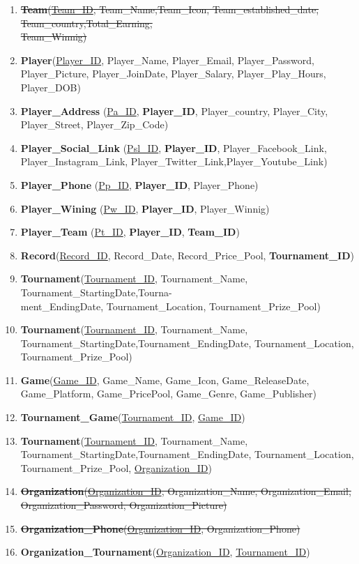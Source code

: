 \begin{enumerate}
    \item \sout{\textbf{Team}(\underline{Team\_ID}, Team\_Name,Team\_Icon, Team\_established\_date, Team\_country,Total\_Earning,\\Team\_Winnig)}
    \item \textbf{Player}(\underline{Player\_ID}, Player\_Name, Player\_Email, Player\_Password, Player\_Picture, Player\_JoinDate, Player\_Salary, Player\_Play\_Hours, Player\_DOB)
    \item \textbf{Player\_Address} (\underline{Pa\_ID}, \textbf{Player\_ID}, Player\_country, Player\_City, Player\_Street, Player\_Zip\_Code)
    \item \textbf{Player\_Social\_Link} (\underline{Psl\_ID}, \textbf{Player\_ID}, Player\_Facebook\_Link, Player\_Instagram\_Link, Player\_Twitter\_Link,Player\_Youtube\_Link)
    \item \textbf{Player\_Phone} (\underline{Pp\_ID}, \textbf{Player\_ID}, Player\_Phone)
    \item \textbf{Player\_Wining} (\underline{Pw\_ID}, \textbf{Player\_ID}, Player\_Winnig)
    \item \textbf{Player\_Team} (\underline{Pt\_ID}, \textbf{Player\_ID}, \textbf{Team\_ID})


    \item \textbf{Record}(\underline{Record\_ID}, Record\_Date, Record\_Price\_Pool, \textbf{Tournament\_ID})
    \item \textbf{Tournament}(\underline{Tournament\_ID}, Tournament\_Name, Tournament\_StartingDate,Tourna-\\ment\_EndingDate, Tournament\_Location, Tournament\_Prize\_Pool)


    \item \textbf{Tournament}(\underline{Tournament\_ID}, Tournament\_Name, Tournament\_StartingDate,Tournament\_EndingDate, Tournament\_Location, Tournament\_Prize\_Pool)
    \item \textbf{Game}(\underline{Game\_ID}, Game\_Name, Game\_Icon, Game\_ReleaseDate, Game\_Platform, Game\_PricePool, Game\_Genre, Game\_Publisher)
    \item \textbf{Tournament\_Game}(\underline{Tournament\_ID}, \underline{Game\_ID})


    \item \textbf{Tournament}(\underline{Tournament\_ID}, Tournament\_Name, Tournament\_StartingDate,Tournament\_EndingDate, Tournament\_Location, Tournament\_Prize\_Pool, \underline{Organization\_ID})
    \item \sout{\textbf{Organization}(\underline{Organization\_ID}, Organization\_Name, Organization\_Email, Organization\_Password, Organization\_Picture)}
    \item \sout{\textbf{Organization\_Phone}(\underline{Organization\_ID}, Organization\_Phone)}
    \item \textbf{Organization\_Tournament}(\underline{Organization\_ID}, \underline{Tournament\_ID})



\end{enumerate}
